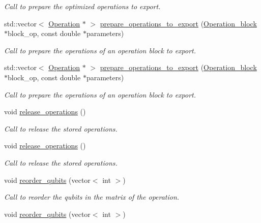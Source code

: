 \begin{DoxyCompactItemize}
\begin{DoxyCompactList}\small\item\em Call to prepare the optimized operations to export. \end{DoxyCompactList}\item 
std\+::vector$<$ \hyperlink{class_operation}{Operation} $\ast$ $>$ \hyperlink{class_decomposition___base_a267addf036c4207905f7f443aea471bb}{prepare\+\_\+operations\+\_\+to\+\_\+export} (\hyperlink{class_operation__block}{Operation\+\_\+block} $\ast$block\+\_\+op, const double $\ast$parameters)
\begin{DoxyCompactList}\small\item\em Call to prepare the operations of an operation block to export. \end{DoxyCompactList}\item 
std\+::vector$<$ \hyperlink{class_operation}{Operation} $\ast$ $>$ \hyperlink{class_decomposition___base_a9d4cf31a7409fcc6a74d6ed927839f15}{prepare\+\_\+operations\+\_\+to\+\_\+export} (\hyperlink{class_operation__block}{Operation\+\_\+block} $\ast$block\+\_\+op, const double $\ast$parameters)
\begin{DoxyCompactList}\small\item\em Call to prepare the operations of an operation block to export. \end{DoxyCompactList}\item 
void \hyperlink{class_operation__block_a7c3d4eadaef2f21f1c5dd9227faec7ce}{release\+\_\+operations} ()
\begin{DoxyCompactList}\small\item\em Call to release the stored operations. \end{DoxyCompactList}\item 
void \hyperlink{class_operation__block_a7c3d4eadaef2f21f1c5dd9227faec7ce}{release\+\_\+operations} ()
\begin{DoxyCompactList}\small\item\em Call to release the stored operations. \end{DoxyCompactList}\item 
void \hyperlink{class_operation__block_af2a71d29cdbce498e85f11b9ed81e0c9}{reorder\+\_\+qubits} (vector$<$ int $>$)
\begin{DoxyCompactList}\small\item\em Call to reorder the qubits in the matrix of the operation. \end{DoxyCompactList}\item 
void \hyperlink{class_operation__block_af2a71d29cdbce498e85f11b9ed81e0c9}{reorder\+\_\+qubits} (vector$<$ int $>$)

\end{DoxyCompactItemize}
